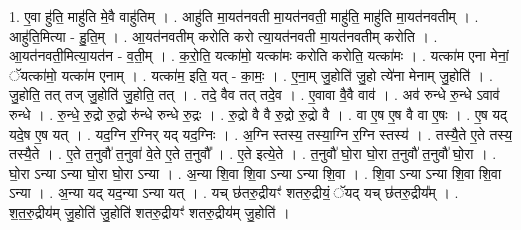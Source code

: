 \documentclass[17pt]{extarticle}
\begin{document}
1. ए॒वा हु॑ति॒ माहु॑ति मे॒वै वाहु॑तिम् । . आहु॑ति मा॒यत॑नवती मा॒यत॑नवती॒ माहु॑ति॒ माहु॑ति मा॒यत॑नवतीम् । . आहु॑ति॒मित्या - हु॒ति॒म् । . आ॒यत॑नवतीम् करोति करो त्या॒यत॑नवती मा॒यत॑नवतीम् करोति । . आ॒यत॑नवती॒मित्या॒यत॑न - व॒ती॒म् । . क॒रो॒ति॒ यत्का॑मो॒ यत्का॑मः करोति करोति॒ यत्का॑मः । . यत्का॑म एना मेनां॒ ॅयत्का॑मो॒ यत्का॑म एनाम् । . यत्का॑म॒ इति॒ यत् - का॒मः॒ । . ए॒ना॒म् जु॒होति॑ जु॒हो त्ये॑ना मेनाम् जु॒होति॑ । . जु॒होति॒ तत् तज् जु॒होति॑ जु॒होति॒ तत् । . तदे॒ वैव तत् तदे॒व । . ए॒वावा वै॒वै वाव॑ । . अव॑ रुन्धे रु॒न्धे ऽवाव॑ रुन्धे । . रु॒न्धे॒ रु॒द्रो रु॒द्रो रु॑न्धे रुन्धे रु॒द्रः । . रु॒द्रो वै वै रु॒द्रो रु॒द्रो वै । . वा ए॒ष ए॒ष वै वा ए॒षः । . ए॒ष यद् यदे॒ष ए॒ष यत् । . यद॒ग्नि र॒ग्निर् यद् यद॒ग्निः । . अ॒ग्नि स्तस्य॒ तस्या॒ग्नि र॒ग्नि स्तस्य॑ । . तस्यै॒ते ए॒ते तस्य॒ तस्यै॒ते । . ए॒ते त॒नुवौ॑ त॒नुवा॑ वे॒ते ए॒ते त॒नुवौ᳚ । . ए॒ते इत्ये॒ते । . त॒नुवौ॑ घो॒रा घो॒रा त॒नुवौ॑ त॒नुवौ॑ घो॒रा । . घो॒रा ऽन्या ऽन्या घो॒रा घो॒रा ऽन्या । . अ॒न्या शि॒वा शि॒वा ऽन्या ऽन्या शि॒वा । . शि॒वा ऽन्या ऽन्या शि॒वा शि॒वा ऽन्या । . अ॒न्या यद् यद॒न्या ऽन्या यत् । . यच् छ॑तरु॒द्रीयꣳ॑ शतरु॒द्रीयं॒ ॅयद् यच् छ॑तरु॒द्रीय᳚म् । . श॒त॒रु॒द्रीय॑म् जु॒होति॑ जु॒होति॑ शतरु॒द्रीयꣳ॑ शतरु॒द्रीय॑म् जु॒होति॑ । \newline
\end{document}
